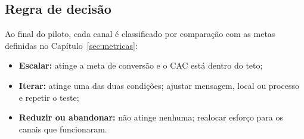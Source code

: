 \subsection{Regra de decisão}

Ao final do piloto, cada canal é classificado por comparação com as metas definidas no
Capítulo~\ref{sec:metricas}:

\begin{itemize}
  \item \textbf{Escalar:} atinge a meta de conversão e o CAC está dentro do teto;
  \item \textbf{Iterar:} atinge uma das duas condições; ajustar mensagem, local ou processo e repetir o teste;
  \item \textbf{Reduzir ou abandonar:} não atinge nenhuma; realocar esforço para os canais que funcionaram.
\end{itemize}
